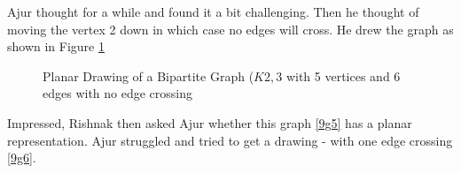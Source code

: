 Ajur thought for a while and found it a bit challenging. Then he thought of moving the vertex 2 down in which case no edges will cross. He drew the graph as shown in Figure \ref{9g4}
\begin{figure}
\begin{center}
\caption{ Planar Drawing of a Bipartite Graph ($K{2,3}$ with 5 vertices and 6 edges with  no edge crossing}\label{9g4}
\end{center}
\end{figure}

Impressed, Rishnak then asked Ajur whether this graph \ref{9g5} has a planar representation. Ajur struggled and tried to get a drawing - with one edge crossing \ref{9g6}. 

